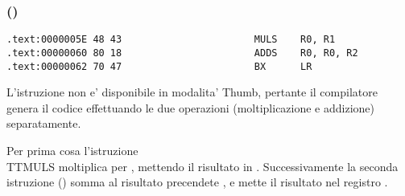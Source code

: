 \subsubsection{\OptimizingKeilVI (\ThumbMode)}

\begin{lstlisting}[label=ARM_leaf_example2]
.text:0000005E 48 43                       MULS    R0, R1
.text:00000060 80 18                       ADDS    R0, R0, R2
.text:00000062 70 47                       BX      LR
\end{lstlisting}

L'istruzione  non e' disponibile in modalita' Thumb, pertante il compilatore genera il codice effettuando le due operazioni 
(moltiplicazione e addizione) separatamente.

Per prima cosa l'istruzione \\TT{MULS} moltiplica  per , mettendo il risultato in .
Successivamente la seconda istruzione () somma al risultato precendete , e mette il risultato nel registro .
